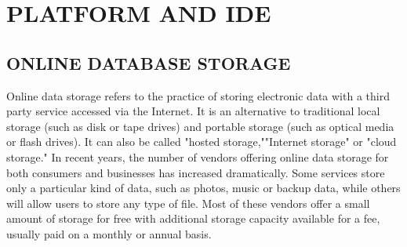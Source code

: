 \documentclass[11pt]{report} %
\begin{document}
\section{PLATFORM AND IDE}
\label{sec:PLATFORM AND IDE}


\subsection{ONLINE DATABASE STORAGE}
\label{subsec:ONLINE DATABASE STORAGE}
Online data storage refers to the practice of storing electronic data with a third party service accessed via the Internet. It is an alternative to traditional local storage (such as disk or tape drives) and portable storage (such as optical media or flash drives). It can also be called "hosted storage,""Internet storage" or "cloud storage."
In recent years, the number of vendors offering online data storage for both consumers and businesses has increased dramatically. Some services store only a particular kind of data, such as photos, music or backup data, while others will allow users to store any type of file. Most of these vendors offer a small amount of storage for free with additional storage capacity available for a fee, usually paid on a monthly or annual basis.
\end{document}
